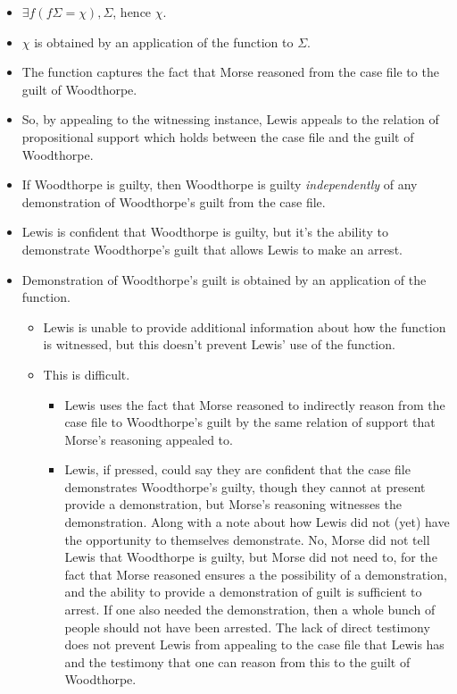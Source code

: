 \documentclass[10pt]{article}
\begin{document}
\begin{itemize}
\item \(\exists f(f\Sigma = \chi), \Sigma\), hence \(\chi\).
\item \(\chi\) is obtained by an application of the function to \(\Sigma\).
\item The function captures the fact that Morse reasoned from the case file to the guilt of Woodthorpe.
\item So, by appealing to the witnessing instance, Lewis appeals to the relation of propositional support which holds between the case file and the guilt of Woodthorpe.
\item If Woodthorpe is guilty, then Woodthorpe is guilty \emph{independently} of any demonstration of Woodthorpe's guilt from the case file.
\item Lewis is confident that Woodthorpe is guilty, but it's the ability to demonstrate Woodthorpe's guilt that allows Lewis to make an arrest.
\item Demonstration of Woodthorpe's guilt is obtained by an application of the function.
  \begin{itemize}
  \item Lewis is unable to provide additional information about how the function is witnessed, but this doesn't prevent Lewis' use of the function.
  \item {\color{red} This is difficult.}
    \begin{itemize}
    \item Lewis uses the fact that Morse reasoned to indirectly reason from the case file to Woodthorpe's guilt by the same relation of support that Morse's reasoning appealed to.
    \item Lewis, if pressed, could say they are confident that the case file demonstrates Woodthorpe's guilty, though they cannot at present provide a demonstration, but Morse's reasoning witnesses the demonstration.
      Along with a note about how Lewis did not (yet) have the opportunity to themselves demonstrate.
      No, Morse did not tell Lewis that Woodthorpe is guilty, but Morse did not need to, for the fact that Morse reasoned ensures a the possibility of a demonstration, and the ability to provide a demonstration of guilt is sufficient to arrest.
      If one also needed the demonstration, then a whole bunch of people should not have been arrested.
      The lack of direct testimony does not prevent Lewis from appealing to the case file that Lewis has and the testimony that one can reason from this to the guilt of Woodthorpe.

\end{itemize}
\end{itemize}
\end{itemize}
\end{document}
